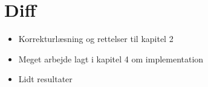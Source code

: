 {
\section*{Diff}
\begin{itemize}
    \item Korrekturlæsning og rettelser til kapitel 2
    \item Meget arbejde lagt i kapitel 4 om implementation
    \item Lidt resultater
\end{itemize}
}

